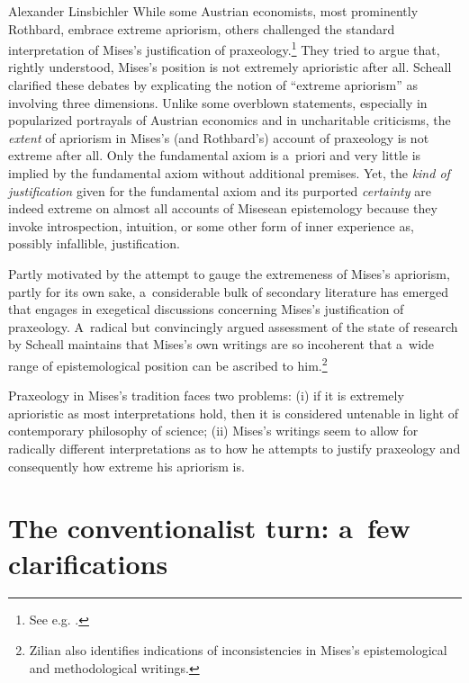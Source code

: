 \begin{artengenv}{Alexander Linsbichler}
While some Austrian economists, most prominently Rothbard, embrace extreme apriorism, others challenged the standard interpretation of Mises's justification of praxeology.\footnote{See e.g. 
\parencite[][]{zanotti_hermeneutics_2023}.%
} They tried to argue that, rightly understood, Mises's position is not extremely aprioristic after all. Scheall 
\parencite[][]{scheall_review_2017} %
 clarified these debates by explicating the notion of ``extreme apriorism'' as involving three dimensions. Unlike some overblown statements, especially in popularized portrayals of Austrian economics and in uncharitable criticisms, the \textit{extent} of apriorism in Mises's (and Rothbard's) account of praxeology is not extreme after all. Only the fundamental axiom is a~priori and very little is implied by the fundamental axiom without additional premises. Yet, the \textit{kind of justification} given for the fundamental axiom and its purported \textit{certainty} are indeed extreme on almost all accounts of Misesean epistemology because they invoke introspection, intuition, or some other form of inner experience as, possibly infallible, justification.



Partly motivated by the attempt to gauge the extremeness of Mises's apriorism, partly for its own sake, a~considerable bulk of secondary literature has emerged that engages in exegetical discussions concerning Mises's justification of praxeology. A~radical but convincingly argued assessment of the state of research by Scheall 
\parencite*[][]{scheall_rise_2023} %
 maintains that Mises's own writings are so incoherent that a~wide range of epistemological position can be ascribed to him.\footnote{Zilian 
\parencite*[][]{zilian_klarheit_1990} %
 also identifies indications of inconsistencies in Mises's epistemological and methodological writings.}



Praxeology in Mises's tradition faces two problems: (i) if it is extremely aprioristic as most interpretations hold, then it is considered untenable in light of contemporary philosophy of science; (ii) Mises's writings seem to allow for radically different interpretations as to how he attempts to justify praxeology and consequently how extreme his apriorism is.



\section{The conventionalist turn: a~few clarifications}


\end{artengenv}
